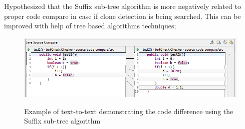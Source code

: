 \documentclass{report}
\begin{document}
Hypothesized that the Suffix sub-tree algorithm is more negatively related to proper code compare in case if clone detection is being searched. This can be improved with help of tree based algorithms techniques;
\begin{figure}[h]
  \centering
  \includegraphics[width=1.00\textwidth]{Figures/text-to-text/text-compared-for-improve}\\[0.1cm]
  \caption[Text comparison example where strings of code are replaced.]{Example of text-to-text demonstrating the code difference using the Suffix sub-tree algorithm }
  \label{fig:text-compared-for-improve}
\end{figure}
\end{document}
